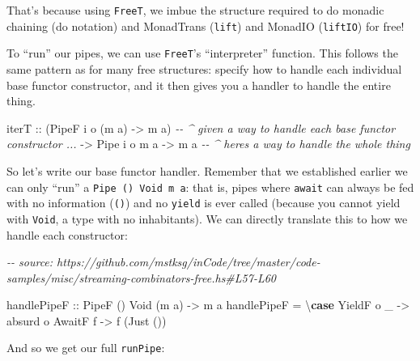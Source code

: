 \documentclass[]{article}
\newenvironment{Shaded}{}{}
\newcommand{\CommentTok}[1]{\textcolor[rgb]{0.38,0.63,0.69}{\textit{#1}}}
\newcommand{\DataTypeTok}[1]{\textcolor[rgb]{0.56,0.13,0.00}{#1}}
\newcommand{\KeywordTok}[1]{\textcolor[rgb]{0.00,0.44,0.13}{\textbf{#1}}}
\newcommand{\NormalTok}[1]{#1}
\newcommand{\OtherTok}[1]{\textcolor[rgb]{0.00,0.44,0.13}{#1}}
\begin{document}
That's because using \texttt{FreeT}, we imbue the structure required to do
monadic chaining (do notation) and MonadTrans (\texttt{lift}) and MonadIO
(\texttt{liftIO}) for free!

To ``run'' our pipes, we can use \texttt{FreeT}'s ``interpreter'' function. This
follows the same pattern as for many free structures: specify how to handle each
individual base functor constructor, and it then gives you a handler to handle
the entire thing.

\begin{Shaded}
\begin{Highlighting}[]
\NormalTok{iterT}
\OtherTok{    ::}\NormalTok{ (}\DataTypeTok{PipeF}\NormalTok{ i o (m a) }\OtherTok{{-}\textgreater{}}\NormalTok{ m a)  }\CommentTok{{-}{-} \^{} given a way to handle each base functor constructor ...}
    \OtherTok{{-}\textgreater{}} \DataTypeTok{Pipe}\NormalTok{ i o m a }\OtherTok{{-}\textgreater{}}\NormalTok{ m a       }\CommentTok{{-}{-} \^{} here\textquotesingle{}s a way to handle the whole thing}
\end{Highlighting}
\end{Shaded}

So let's write our base functor handler. Remember that we established earlier we
can only ``run'' a \texttt{Pipe\ ()\ Void\ m\ a}: that is, pipes where
\texttt{await} can always be fed with no information (\texttt{()}) and no
\texttt{yield} is ever called (because you cannot yield with \texttt{Void}, a
type with no inhabitants). We can directly translate this to how we handle each
constructor:

\begin{Shaded}
\begin{Highlighting}[]
\CommentTok{{-}{-} source: https://github.com/mstksg/inCode/tree/master/code{-}samples/misc/streaming{-}combinators{-}free.hs\#L57{-}L60}

\OtherTok{handlePipeF ::} \DataTypeTok{PipeF}\NormalTok{ () }\DataTypeTok{Void}\NormalTok{ (m a) }\OtherTok{{-}\textgreater{}}\NormalTok{ m a}
\NormalTok{handlePipeF }\OtherTok{=}\NormalTok{ \textbackslash{}}\KeywordTok{case}
    \DataTypeTok{YieldF}\NormalTok{ o \_ }\OtherTok{{-}\textgreater{}}\NormalTok{ absurd o}
    \DataTypeTok{AwaitF}\NormalTok{ f   }\OtherTok{{-}\textgreater{}}\NormalTok{ f (}\DataTypeTok{Just}\NormalTok{ ())}
\end{Highlighting}
\end{Shaded}

And so we get our full \texttt{runPipe}:
\end{document}
